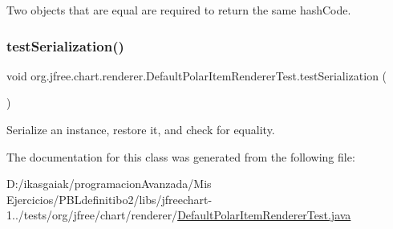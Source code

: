 Two objects that are equal are required to return the same hash\+Code. \mbox{\label{classorg_1_1jfree_1_1chart_1_1renderer_1_1_default_polar_item_renderer_test_a44c57be6967823043edf1f8cf7dce1f2}} 
\subsubsection{\texorpdfstring{test\+Serialization()}{testSerialization()}}
{\footnotesize\ttfamily void org.\+jfree.\+chart.\+renderer.\+Default\+Polar\+Item\+Renderer\+Test.\+test\+Serialization (\begin{DoxyParamCaption}{ }\end{DoxyParamCaption})}

Serialize an instance, restore it, and check for equality. 

The documentation for this class was generated from the following file\+:\begin{DoxyCompactItemize}
\item 
D\+:/ikasgaiak/programacion\+Avanzada/\+Mis Ejercicios/\+P\+B\+Ldefinitibo2/libs/jfreechart-\/1../tests/org/jfree/chart/renderer/\mbox{\hyperlink{_default_polar_item_renderer_test_8java}{Default\+Polar\+Item\+Renderer\+Test.\+java}}\end{DoxyCompactItemize}
